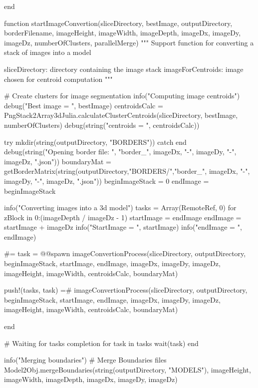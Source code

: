 \documentclass[11pt,oneside]{article}	%
\begin{document}
{end

function startImageConvertion(sliceDirectory, bestImage, outputDirectory, borderFilename,
                              imageHeight, imageWidth, imageDepth,
                              imageDx, imageDy, imageDz,
                              numberOfClusters, parallelMerge)
  """
  Support function for converting a stack of images into a model

  sliceDirectory: directory containing the image stack
  imageForCentroids: image chosen for centroid computation
  """

  # Create clusters for image segmentation
  info("Computing image centroids")
  debug("Best image = ", bestImage)
  centroidsCalc = PngStack2Array3dJulia.calculateClusterCentroids(sliceDirectory, bestImage, numberOfClusters)
  debug(string("centroids = ", centroidsCalc))

  try
    mkdir(string(outputDirectory, "BORDERS"))
  catch
  end
  debug(string("Opening border file: ", "border_", imageDx, "-", imageDy, "-", imageDz, ".json"))
  boundaryMat = getBorderMatrix(string(outputDirectory,"BORDERS/","border_", imageDx, "-",
                                       imageDy, "-", imageDz, ".json"))
  beginImageStack = 0
  endImage = beginImageStack

  info("Converting images into a 3d model")
  tasks = Array(RemoteRef, 0)
  for zBlock in 0:(imageDepth / imageDz - 1)
    startImage = endImage
    endImage = startImage + imageDz
    info("StartImage = ", startImage)
    info("endImage = ", endImage)

    #=
    task = @@spawn imageConvertionProcess(sliceDirectory, outputDirectory,
                           beginImageStack, startImage, endImage,
                           imageDx, imageDy, imageDz,
                           imageHeight, imageWidth,
                           centroidsCalc, boundaryMat)

    push!(tasks, task)
    =#
    imageConvertionProcess(sliceDirectory, outputDirectory,
                           beginImageStack, startImage, endImage,
                           imageDx, imageDy, imageDz,
                           imageHeight, imageWidth,
                           centroidsCalc, boundaryMat)

  end

  # Waiting for tasks completion
  for task in tasks
    wait(task)
  end

  info("Merging boundaries")
  # Merge Boundaries files
  Model2Obj.mergeBoundaries(string(outputDirectory, "MODELS"),
                            imageHeight, imageWidth, imageDepth,
                            imageDx, imageDy, imageDz)

}
\end{document}
